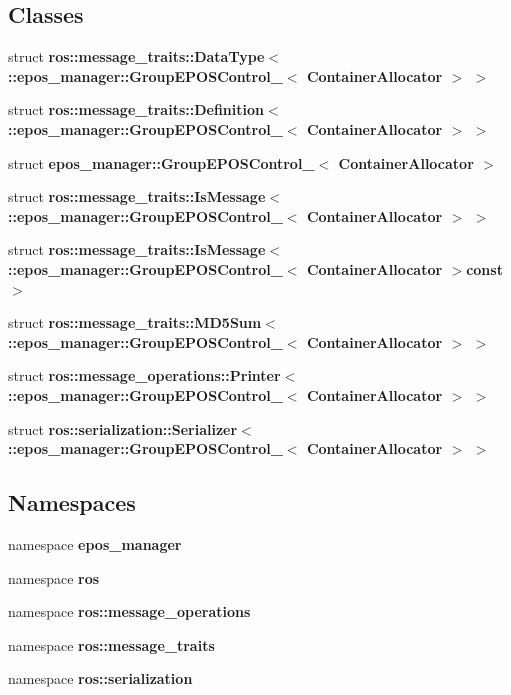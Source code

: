 \subsection*{\-Classes}
\begin{DoxyCompactItemize}
\item 
struct {\bf ros\-::message\-\_\-traits\-::\-Data\-Type$<$ \-::epos\-\_\-manager\-::\-Group\-E\-P\-O\-S\-Control\-\_\-$<$ Container\-Allocator $>$ $>$}
\item 
struct {\bf ros\-::message\-\_\-traits\-::\-Definition$<$ \-::epos\-\_\-manager\-::\-Group\-E\-P\-O\-S\-Control\-\_\-$<$ Container\-Allocator $>$ $>$}
\item 
struct {\bf epos\-\_\-manager\-::\-Group\-E\-P\-O\-S\-Control\-\_\-$<$ Container\-Allocator $>$}
\item 
struct {\bf ros\-::message\-\_\-traits\-::\-Is\-Message$<$ \-::epos\-\_\-manager\-::\-Group\-E\-P\-O\-S\-Control\-\_\-$<$ Container\-Allocator $>$ $>$}
\item 
struct {\bf ros\-::message\-\_\-traits\-::\-Is\-Message$<$ \-::epos\-\_\-manager\-::\-Group\-E\-P\-O\-S\-Control\-\_\-$<$ Container\-Allocator $>$const  $>$}
\item 
struct {\bf ros\-::message\-\_\-traits\-::\-M\-D5\-Sum$<$ \-::epos\-\_\-manager\-::\-Group\-E\-P\-O\-S\-Control\-\_\-$<$ Container\-Allocator $>$ $>$}
\item 
struct {\bf ros\-::message\-\_\-operations\-::\-Printer$<$ \-::epos\-\_\-manager\-::\-Group\-E\-P\-O\-S\-Control\-\_\-$<$ Container\-Allocator $>$ $>$}
\item 
struct {\bf ros\-::serialization\-::\-Serializer$<$ \-::epos\-\_\-manager\-::\-Group\-E\-P\-O\-S\-Control\-\_\-$<$ Container\-Allocator $>$ $>$}
\end{DoxyCompactItemize}
\subsection*{\-Namespaces}
\begin{DoxyCompactItemize}
\item 
namespace {\bf epos\-\_\-manager}
\item 
namespace {\bf ros}
\item 
namespace {\bf ros\-::message\-\_\-operations}
\item 
namespace {\bf ros\-::message\-\_\-traits}
\item 
namespace {\bf ros\-::serialization}
\end{DoxyCompactItemize}
